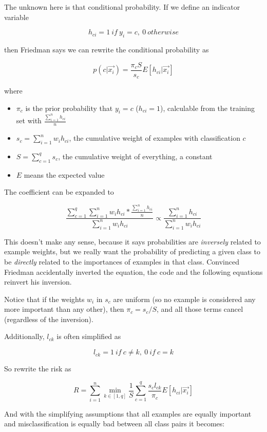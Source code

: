 \documentclass[12pt]{article}
\begin{document}
The unknown here is that conditional probability. If we define an indicator variable

$$h_{ci} = 1\ if\ y_i=c,\ 0\ otherwise$$

then Friedman says we can rewrite the conditional probability as

$$p(c | \vec{x_i}) = \frac{\pi_c S}{s_c} E[h_{ci} | \vec{x_i}]$$

where
\begin{itemize}
	\setlength\itemsep{-2mm}
	\item $\pi_c$ is the prior probability that $y_i=c$ ($h_{ci}=1$), calculable from the training set with $\frac{\sum_{i=1}^n h_{ci}}{n}$
	\item $s_c = \sum_{i=1}^n w_i h_{ci}$, the cumulative weight of examples with classification $c$
	\item $S = \sum_{c=1}^q s_c$, the cumulative weight of everything, a constant
	\item $E$ means the expected value
\end{itemize}

The coefficient can be expanded to

$$\frac{\sum_{c=1}^q \sum_{i=1}^n w_i h_{ci} * \frac{\sum_{i=1}^n h_{ci}}{n}}{\sum_{i=1}^n w_i h_{ci}} \propto \frac{\sum_{i=1}^n h_{ci}}{\sum_{i=1}^n w_i h_{ci}}$$

This doesn't make any sense, because it says probabilities are \textit{inversely} related to example weights, but we really want the probability of predicting a given class to be \textit{directly} related to the importances of examples in that class. Convinced Friedman accidentally inverted the equation, the code and the following equations reinvert his inversion.

Notice that if the weights $w_i$ in $s_c$ are uniform (so no example is considered any more important than any other), then $\pi_c = s_c/S$, and all those terms cancel (regardless of the inversion).

Additionally, $l_{ck}$ is often simplified as

$$l_{ck} = 1\ if\ c \neq k,\ 0\ if\ c=k$$

So rewrite the risk as

$$R = \sum_{i=1}^n \min_{k \in [1,q]} \frac{1}{S} \sum_{c=1}^q \frac{s_c l_{ck}}{\pi_c} E[h_{ci} | \vec{x_i}]$$

And with the simplifying assumptions that all examples are equally important and misclassification is equally bad between all class pairs it becomes:
\end{document}

